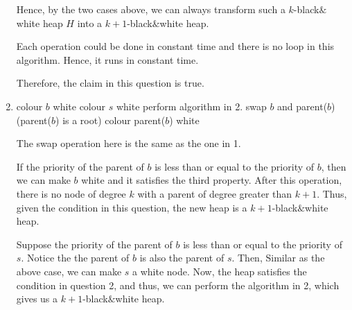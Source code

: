 \documentclass[10pt]{article}
\begin{document}
\begin{enumerate}
		Hence, by the two cases above, we can always transform such a
		$k$-black$\&$white heap $H$ into a $k+1$-black$\&$white heap.

		Each operation could be done in constant time and there is no loop in
		this algorithm.
		Hence, it runs in constant time.

		Therefore, the claim in this question is true.

	\item
	\begin{comment}
		Suppose you have a linked-list H of binomial trees that satisfies all
		the properties of a black$&$white heap except that it has one black node
		b od degree k and its parent has degree greater than $k+1$.
		Suppose that the sibling $s$ of degree $k+1$ of $b$ is black.
		Given pointers to $b$ and $s$, explain how to transform H in constant
		time into a k'-black$&$white heap with the some set of nodes, for some
		$k' > k$.
	\end{comment}

		\begin{algorithmic}[1]
				\State colour $b$ white
				\State colour $s$ white
				\State perform algorithm in 2.
			\Else
				\State swap $b$ and parent($b$)
				\If(parent($b$) is a root)
					\State colour parent($b$) white
				\EndIf
			\EndIf
		\end{algorithmic}

		The swap operation here is the same as the one in 1.

		If the priority of the parent of $b$ is less than or equal to the
		priority of $b$, then we can make $b$ white and it satisfies the third
		property.
		After this operation, there is no node of degree $k$ with a parent of
		degree greater than $k+1$.
		Thus, given the condition in this question, the new heap is a
		$k+1$-black$\&$white heap. 

		Suppose the priority of the parent of $b$ is less than or equal to the
		priority of $s$.
		Notice the the parent of $b$ is also the parent of $s$.
		Then, Similar as the above case, we can make $s$ a white node. 
		Now, the heap satisfies the condition in question 2, and thus, we can
		perform the algorithm in 2, which gives us a $k+1$-black$\&$white heap.


\end{enumerate}
\end{document}
